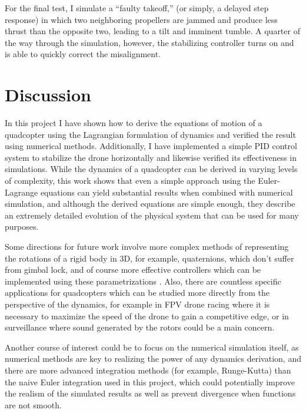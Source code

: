 \documentclass{article}
\begin{document}

For the final test, I simulate a ``faulty takeoff,'' (or simply, a delayed step response) in which two neighboring propellers are jammed and produce less thrust than the opposite two, leading to a tilt and imminent tumble. A quarter of the way through the simulation, however, the stabilizing controller turns on and is able to quickly correct the misalignment.

\newpage
\section{Discussion}

In this project I have shown how to derive the equations of motion of a quadcopter using the Lagrangian formulation of dynamics and verified the result using numerical methods. Additionally, I have implemented a simple PID control system to stabilize the drone horizontally and likewise verified its effectiveness in simulations. While the dynamics of a quadcopter can be derived in varying levels of complexity, this work shows that even a simple approach using the Euler-Lagrange equations can yield substantial results when combined with numerical simulation, and although the derived equations are simple enough, they describe an extremely detailed evolution of the physical system that can be used for many purposes.

Some directions for future work involve more complex methods of representing the rotations of a rigid body in 3D, for example, quaternions, which don't suffer from gimbal lock, and of course more effective controllers which can be implemented using these parametrizations \cite{fresk2013full}. Also, there are countless specific applications for quadcopters which can be studied more directly from the perspective of the dynamics, for example in FPV drone racing where it is necessary to maximize the speed of the drone to gain a competitive edge, or in surveillance where sound generated by the rotors could be a main concern. 

Another course of interest could be to focus on the numerical simulation itself, as numerical methods are key to realizing the power of any dynamics derivation, and there are more advanced integration methods (for example, Runge-Kutta) than the naive Euler integration used in this project, which could potentially improve the realism of the simulated results as well as prevent divergence when functions are not smooth. 
\end{document}

